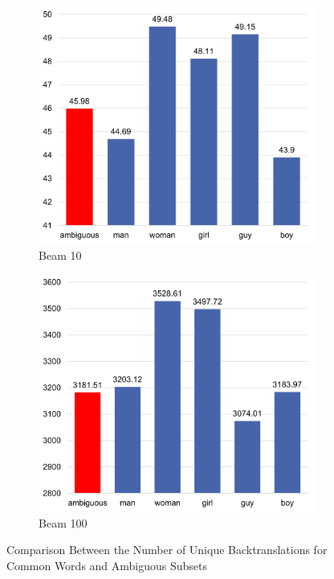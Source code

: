 \begin{figure}
     \centering
     
     \begin{subfigure}{0.49\textwidth}
         \centering
         \includegraphics[width=\textwidth]{figures/uniqueness/range_beam_10.png}
         \caption{Beam 10}
         \label{fig:three sin x}
     \end{subfigure}
     \hfill
     \begin{subfigure}{0.49\textwidth}
         \centering
         \includegraphics[width=\textwidth]{figures/uniqueness/range_beam_100.png}
         \caption{Beam 100}
         \label{fig:five over x}
     \end{subfigure}
     
    \caption{Comparison Between the Number of Unique Backtranslations for Common Words and Ambiguous Subsets}
    \label{fig:range}

\end{figure}

